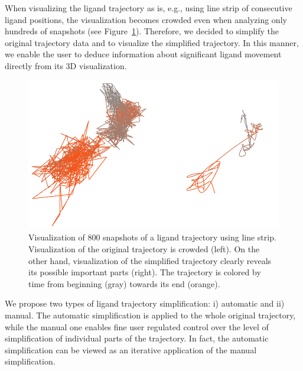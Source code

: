 When visualizing the ligand trajectory as is, e.g., using line strip of consecutive ligand positions, the visualization becomes crowded even when analyzing only hundreds of snapshots (see Figure~\ref{fig:crowded}).
Therefore, we decided to simplify the original trajectory data and to visualize the simplified trajectory.
In this manner, we enable the user to deduce information about significant ligand movement directly from its 3D visualization.

\begin{figure}
	\includegraphics[width=0.95\linewidth]{img/crowded-combined.png}
\caption{Visualization of 800 snapshots of a ligand trajectory using line strip.
Visualization of the original trajectory is crowded (left).
On the other hand, visualization of the simplified trajectory clearly reveals its possible important parts (right).
The trajectory is colored by time from beginning (gray) towards its end (orange).}
\label{fig:crowded}
\end{figure}

We propose two types of ligand trajectory simplification: i) automatic and ii) manual.
The automatic simplification is applied to the whole original trajectory, while the manual one enables fine user regulated control over the level of simplification of individual parts of the trajectory.
In fact, the automatic simplification can be viewed as an iterative application of the manual simplification.

